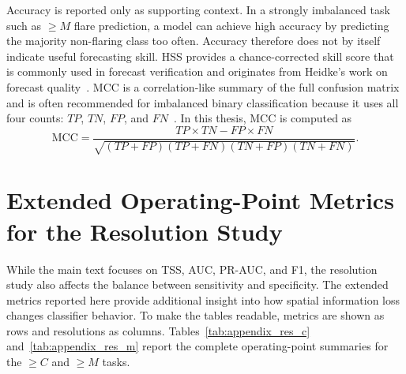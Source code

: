 Accuracy is reported only as supporting context. In a strongly imbalanced task such as $\geq M$ flare prediction, a model can achieve high accuracy by predicting the majority non-flaring class too often. Accuracy therefore does not by itself indicate useful forecasting skill. HSS provides a chance-corrected skill score that is commonly used in forecast verification and originates from Heidke's work on forecast quality~\cite{ref_heidke_original}. MCC is a correlation-like summary of the full confusion matrix and is often recommended for imbalanced binary classification because it uses all four counts: $TP$, $TN$, $FP$, and $FN$~\cite{ref_chicco_mcc}. In this thesis, MCC is computed as
\begin{equation}
\mathrm{MCC}=
\frac{TP \times TN - FP \times FN}
{\sqrt{(TP+FP)(TP+FN)(TN+FP)(TN+FN)}}.
\end{equation}

\section{Extended Operating-Point Metrics for the Resolution Study}
\label{app:extended_resolution_metrics}

While the main text focuses on TSS, AUC, PR-AUC, and F1, the resolution study also affects the balance between sensitivity and specificity. The extended metrics reported here provide additional insight into how spatial information loss changes classifier behavior. To make the tables readable, metrics are shown as rows and resolutions as columns. Tables~\ref{tab:appendix_res_c} and~\ref{tab:appendix_res_m} report the complete operating-point summaries for the $\geq C$ and $\geq M$ tasks.

